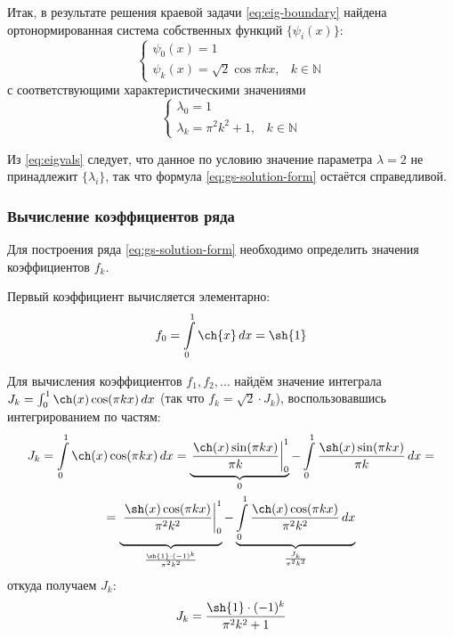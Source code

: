 \documentclass[11pt]{article}
\numberwithin{equation}{section}
\newcommand{\intl}{\int\limits}
\providecommand{\intat}[3]{\left. {#1}\right\vert^{#2}_{#3}}
\providecommand{\set}[1]{\mathbb{#1}}
\begin{document}
Итак, в результате решения краевой задачи \eqref{eq:eig-boundary}
найдена ортонормированная система собственных функций $\{\psi_i(x)\}$:
\begin{equation}
  \label{eq:eigfuns}
  \begin{cases}
    \psi_0(x) = 1 \\
    \psi_k(x) = \sqrt{2} \cos{\pi k x}, & k \in \set{N}
  \end{cases}
\end{equation}
с соответствующими характеристическими значениями
\begin{equation}
  \label{eq:eigvals}
  \begin{cases}
    \lambda_0 = 1 \\
    \lambda_k = \pi^2 k^2 + 1, & k \in \set{N}
  \end{cases}
\end{equation}

Из \eqref{eq:eigvals} следует, что данное по условию значение
параметра $\lambda = 2$ не принадлежит $\{\lambda_i\}$, так что
формула \eqref{eq:gs-solution-form} остаётся справедливой.

\subsubsection{Вычисление коэффициентов ряда}

Для построения ряда \eqref{eq:gs-solution-form} необходимо определить
значения коэффициентов $f_k$.

Первый коэффициент вычисляется элементарно:
\begin{equation}
  f_0 = \intl_0^1 \ch{x} \,dx = \sh{1}
\end{equation}

Для вычисления коэффициентов $f_1, f_2, \dotsc$ найдём значение
интеграла $J_k = \int_0^1{\ch(x) \cos(\pi k x)\,dx}$ (так что $f_k =
\sqrt{2}\cdot J_k$), воспользовавшись интегрированием по частям:
\begin{multline*}
  J_k = \intl_0^1{\ch(x) \cos(\pi k x)\,dx} =
  \underbrace{\intat{\frac{\ch(x)\sin(\pi k x)}{\pi k}}{1}{0}}_0 -
  \intl_0^1\frac{\sh(x) \sin(\pi k x)}{\pi k} \,dx = \\ =
  \underbrace{\vphantom{\intl_0^1}\intat{\frac{\sh(x)\cos(\pi k
        x)}{\pi^2 k^2}}{1}{0}}_{\frac{\sh{1}\cdot (-1)^k}{\pi^2 k^2}}
  - \underbrace{\intl_0^1{\frac{\ch(x) \cos(\pi k x)}{\pi^2
        k^2}\,dx}}_{\frac{J_k}{\pi^2 k^2}}
\end{multline*}
откуда получаем $J_k$:
\begin{gather*}
  J_k = \frac{\sh{1}\cdot (-1)^k}{\pi^2 k^2 + 1}
\end{gather*}
\end{document}
